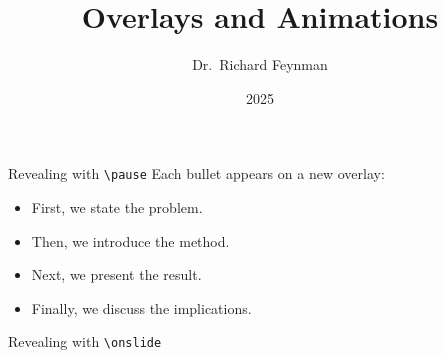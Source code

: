 \documentclass{beamer}
\title{Overlays and Animations}
\author{Dr.~Richard Feynman}
\institute{Caltech}
\date{2025}
\begin{document}
\begin{frame}
  \titlepage
\end{frame}

\begin{frame}{Revealing with \texttt{\textbackslash pause}}
  Each bullet appears on a new overlay:
  \begin{itemize}
    \item First, we state the problem.
    \pause
    \item Then, we introduce the method.
    \pause
    \item Next, we present the result.
    \pause
    \item Finally, we discuss the implications.
  \end{itemize}
\end{frame}

\begin{frame}{Revealing with \texttt{\textbackslash onslide}}
  \vspace{0.5em}

  \vspace{0.5em}

  \vspace{0.5em}

\end{frame}
\end{document}
